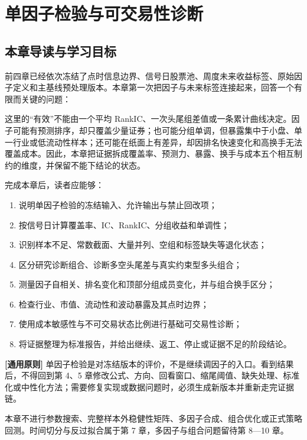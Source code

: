\chapter{单因子检验与可交易性诊断}
\label{ch:single-factor}

\section{本章导读与学习目标}

前四章已经依次冻结了点时信息边界、信号日股票池、周度未来收益标签、原始因子定义和主基线预处理版本。本章第一次把因子与未来标签连接起来，回答一个有限而关键的问题：

这里的“有效”不能由一个平均 RankIC、一次头尾组差值或一条累计曲线决定。因子可能有预测排序，却只覆盖少量证券；也可能分组单调，但暴露集中于小盘、单一行业或低流动性样本；还可能在纸面上有差异，却因排名快速变化和高换手无法覆盖成本。因此，本章把证据拆成覆盖率、预测力、暴露、换手与成本五个相互制约的维度，并保留不能下结论的状态。

完成本章后，读者应能够：

\begin{enumerate}
  \item 说明单因子检验的冻结输入、允许输出与禁止回改项；
  \item 按信号日计算覆盖率、IC、RankIC、分组收益和单调性；
  \item 识别样本不足、常数截面、大量并列、空组和标签缺失等退化状态；
  \item 区分研究诊断组合、诊断多空头尾差与真实约束型多头组合；
  \item 测量因子自相关、排名变化和顶部分组成员变化，并与组合换手区分；
  \item 检查行业、市值、流动性和波动暴露及其点时边界；
  \item 使用成本敏感性与不可交易状态比例进行基础可交易性诊断；
  \item 将证据整理为标准报告，并给出继续、返工、停止或证据不足的阶段结论。
\end{enumerate}

\begin{principlebox}
\textbf{[通用原则]} 单因子检验是对冻结版本的评价，不是继续调因子的入口。看到结果后，不得回到第 4、5 章修改公式、方向、回看窗口、缩尾阈值、缺失处理、标准化或中性化方法；需要修复实现或数据问题时，必须生成新版本并重新走完证据链。
\end{principlebox}

本章不进行参数搜索、完整样本外稳健性矩阵、多因子合成、组合优化或正式策略回测。时间切分与反过拟合属于第 7 章，多因子与组合问题留待第 8—10 章。

